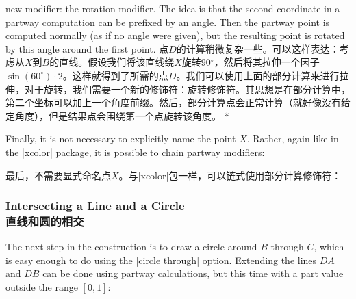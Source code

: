 \begin{paracol}{2}
new modifier: the rotation modifier. The idea is that the second coordinate in
a partway computation can be prefixed by an angle. Then the partway point is
computed normally (as if no angle were given), but the resulting point is
rotated by this angle around the first point.
\switchcolumn
点$D$的计算稍微复杂一些。可以这样表达：考虑从$X$到$B$的直线。假设我们将该直线绕$X$旋转90$^\circ$，然后将其拉伸一个因子$\sin(60^\circ) \cdot 2$。这样就得到了所需的点$D$。我们可以使用上面的部分计算来进行拉伸，对于旋转，我们需要一个新的修饰符：旋转修饰符。其思想是在部分计算中，第二个坐标可以加上一个角度前缀。然后，部分计算点会正常计算（就好像没有给定角度），但是结果点会围绕第一个点旋转该角度。
\switchcolumn[1]*%
\begin{codeexample}[preamble={\usetikzlibrary{calc}}]
\end{codeexample}

Finally, it is not necessary to explicitly name the point $X$. Rather, again
like in the |xcolor| package, it is possible to chain partway modifiers:

最后，不需要显式命名点$X$。与|xcolor|包一样，可以链式使用部分计算修饰符：

%
\begin{codeexample}[preamble={\usetikzlibrary{calc}}]
\end{codeexample}



\subsubsection{Intersecting a Line and a Circle\\直线和圆的相交}

The next step in the construction is to draw a circle around $B$ through $C$,
which is easy enough to do using the |circle through| option. Extending the
lines $DA$ and $DB$ can be done using partway calculations, but this time with
a part value outside the range $[0,1]$:


\end{paracol}
